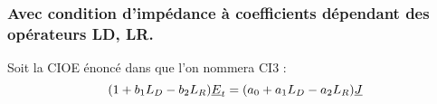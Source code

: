








\subsubsection{Avec condition d'impédance à coefficients dépendant des opérateurs LD, LR.}

Soit la CIOE énoncé dans \cite{soudais_3d_2017} que l'on nommera CI3 :
\begin{equation}
\label{eq:unicite:ci3:ci3}
( 1 + b_1 L_D - b_2 L_R)\underline{E}_t = (a_0 + a_1 L_D - a_2 L_R ) \underline{J}
\end{equation}

